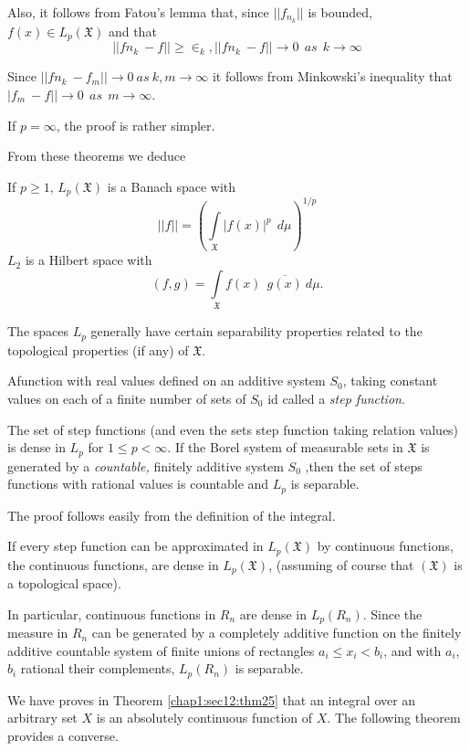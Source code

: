 Also, it follows from Fatou's lemma that, since $||f_{n_k}||$ is
bounded, $f(x)\in L_p(\mathfrak{X})$ and that 
$$
||f{n_k}~-f||\geq \in_k,||f{n_k}~-f||\rightarrow 0~~as~~k \rightarrow
\infty
$$

Since $||f{n_k}~ - f_m||\rightarrow 0~ as~k,m \rightarrow \infty$ it
follows from Minkowski's inequality that $|f_m~-f||\rightarrow0~~as~~m
\rightarrow \infty$.

If $p=\infty$, the proof is rather simpler.

From these theorems we deduce

\begin{theorem}\label{chap1:sec16:thm41}
  If $p \ge 1$, $L_p(\mathfrak{X})$ is a Banach space with 
  $$ 
  ||f||=\left(\int\limits_{\mathfrak{X}}|f(x)|^p ~~d \mu\right)^{1/p}
  $$
  $L_2$ is a Hilbert space with
  $$
  (f,g)=\int\limits_{\mathfrak{X}}f(x)~~ \overline{g(x)}~d\mu.
  $$
\end{theorem}

The spaces $L_p$ generally have certain separability properties
related to the topological properties (if any) of $\mathfrak{X}$.

A\pageoriginale function with real values defined on an additive system $S_0$,
taking  constant values on each of a finite number of sets of $S_0$
id called a \textit{step function}.

\begin{theorem}\label{chap1:sec16:thm42} %
 The set of step functions (and even
  the sets step function taking relation values) is dense in $L_p$
  for $1\le p< \infty$. If the Borel system of measurable sets in
  $\mathfrak{X}$ is generated by a \textit{countable,} finitely additive system
  $S_0$ ,then the set of steps functions with rational values is
  countable and $L_p$ is separable. 
\end{theorem}
The proof follows easily from the definition of the integral.

\begin{theorem}\label{chap1:sec16:thm43}
  If every step function can be approximated in
  $L_p(\mathfrak{X})$ by continuous functions, the
  continuous functions, are dense in
  $L_p(\mathfrak{X})$, (assuming of course that $(\mathfrak{X})$ is a
  topological space). 
  
  In particular, continuous functions in $R_n$ are dense in
  $L_p(R_n)$. Since the measure in $R_n$ can be generated by a
  completely additive function on the finitely additive countable
  system of finite unions of rectangles $a_i \le x_i < b_i$, and  
  with $a_i$, $b_i$ rational their complements, $L_p(R_n)$ is separable. 
  
  We have proves in Theorem \ref{chap1:sec12:thm25} that an integral over an arbitrary set $X$
  is an absolutely continuous function of
  $X$. The following theorem provides a converse. 
\end{theorem}

